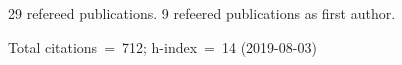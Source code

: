 29 refereed publications. 9 refeered publications as first author.

Total citations~=~712; h-index~=~14 (2019-08-03)